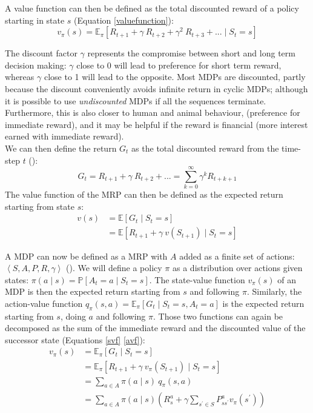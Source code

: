  A value function can then be defined as the total discounted reward of a policy starting in state $s$ (Equation \ref{valuefunction}):
\begin{equation}
\label{valuefunction}
	v_{\pi}(s)=\mathbb{E}_{\pi} \left[R_{t+1}+\gamma \: R_{t+2} + \gamma^{2} \:R_{t+3} + ... \mid S_t = s \right]
\end{equation}

 The discount factor $\gamma$ represents the compromise between short and long term decision making: $\gamma$ close to 0 will lead to preference for short term reward, whereas $\gamma$ close to 1 will  lead to the opposite. Most MDPs are discounted, partly because the discount conveniently avoids infinite return in cyclic MDPs; although it is possible to use \textit{undiscounted} MDPs if all the sequences terminate. Furthermore, this is also closer to human and animal behaviour, (preference for immediate reward), and it may be helpful if the reward is financial (more interest earned with immediate reward).\\
 We can then define the return $G_t$ as the total discounted reward from the time-step $t$ (\cite{silver2015}): 
 \begin{equation}
 	G_t = R_{t+1} + \gamma \: R_{t+2} + ... = \sum\limits_{k=0}^{\infty}\gamma^{k}R_{t+k+1}
 \end{equation}
 The value function of the MRP can then be defined as the expected return starting from state $s$:
 \begin{equation}
 \begin{split}
 	v(s) & = \mathbb{E}\left[G_t \mid S_t = s\right] \\
 	 & = \mathbb{E}\left[ R_{t+1} + \gamma \: v(S_{t+1}) \mid S_t= s \right]
 \end{split}
 \end{equation}
 
A MDP can now be defined as a MRP with $A$ added as a finite set of actions: $\left< S,A,P,R,\gamma \right>$ (\cite{mdpinai}). We will define a policy $\pi$ as a distribution over actions given states: $\pi(a \mid s) = \mathbb{P} [A_t = a \mid S_t = s]$. The state-value function $v_{\pi}(s)$ of an MDP is then the expected return starting from $s$ and following $\pi$. Similarly, the action-value function $q_{\pi}(s,a)= \mathbb{E}_{\pi}[G_t \mid S_t = s, A_t = a]$ is the expected return starting from $s$, doing $a$ and following $\pi$. Those two functions can again be decomposed as the sum of the immediate reward and the discounted value of the successor state (Equations \ref{svf} \ref{avf}):
 \begin{equation}
 \label{svf}
 	\begin{split}
 		v_\pi(s) & = \mathbb{E}_{\pi}[G_t \mid S_t = s] \\
 		& = \mathbb{E}_{\pi}[R_{t+1} + \gamma \: v_{\pi}(S_{t+1}) \mid S_t = s] \\
 		& = \sum\limits_{a \in A}\pi(a\mid
 		s) \: q_\pi(s,a) \\
 		& = \sum\limits_{a \in A}\pi(a \mid s)\left( R_s^{a} +\gamma \sum\limits_{s^{'} \in S} P_{ss^{'}}^{a}v_\pi(s^{'})\right)
 	\end{split}
 \end{equation}
 

